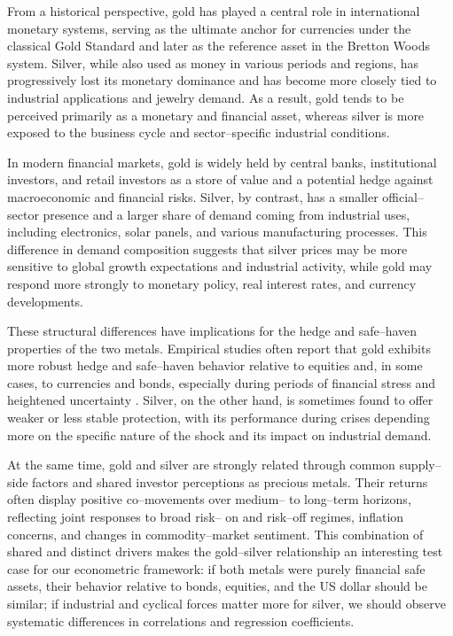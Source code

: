 From a historical perspective, gold has played a central role in international monetary
systems, serving as the ultimate anchor for currencies under the classical Gold Standard
and later as the reference asset in the Bretton Woods system. Silver, while also used as
money in various periods and regions, has progressively lost its monetary dominance and
has become more closely tied to industrial applications and jewelry demand. As a result,
gold tends to be perceived primarily as a monetary and financial asset, whereas silver is
more exposed to the business cycle and sector–specific industrial conditions.

In modern financial markets, gold is widely held by central banks, institutional
investors, and retail investors as a store of value and a potential hedge against
macroeconomic and financial risks. Silver, by contrast, has a smaller official–sector
presence and a larger share of demand coming from industrial uses, including electronics,
solar panels, and various manufacturing processes. This difference in demand composition
suggests that silver prices may be more sensitive to global growth expectations and
industrial activity, while gold may respond more strongly to monetary policy, real
interest rates, and currency developments.

These structural differences have implications for the hedge and safe–haven properties of
the two metals. Empirical studies often report that gold exhibits more robust hedge and
safe–haven behavior relative to equities and, in some cases, to currencies and bonds,
especially during periods of financial stress and heightened uncertainty
. Silver, on the other hand, is sometimes found to offer
weaker or less stable protection, with its performance during crises depending more on the
specific nature of the shock and its impact on industrial demand.

At the same time, gold and silver are strongly related through common supply–side factors
and shared investor perceptions as precious metals. Their returns often display positive
co–movements over medium– to long–term horizons, reflecting joint responses to broad risk–
on and risk–off regimes, inflation concerns, and changes in commodity–market sentiment.
This combination of shared and distinct drivers makes the gold–silver relationship an
interesting test case for our econometric framework: if both metals were purely financial
safe assets, their behavior relative to bonds, equities, and the US dollar should be
similar; if industrial and cyclical forces matter more for silver, we should observe
systematic differences in correlations and regression coefficients.

